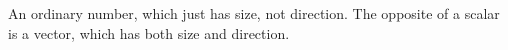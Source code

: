 An ordinary number, which just has size, not direction.
The opposite of a scalar is a vector, which has both 
size and direction.